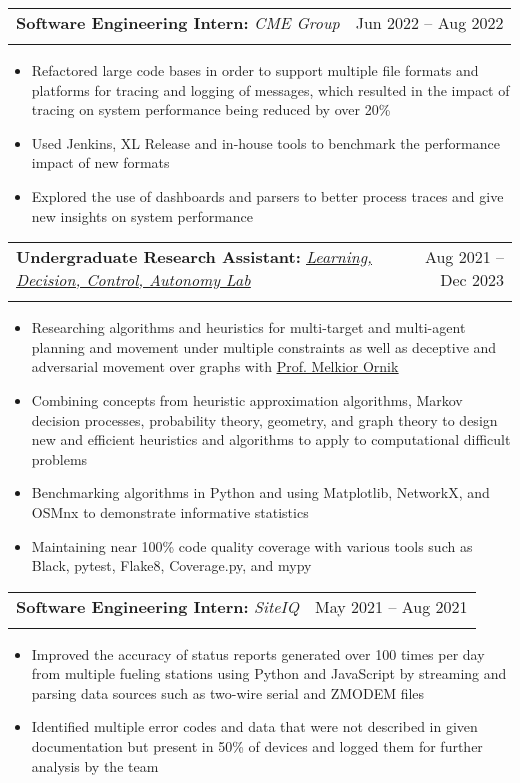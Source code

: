 \documentclass[letterpaper,11pt]{article}
\makeatletter
\newcommand{\resumeItem}[1]{
  \item\small{
    {#1 \vspace{-2pt}}
  }
}
\newcommand{\resumeSubheading}[4]{
  \vspace{-2pt}\item
    \begin{tabular*}{0.97\textwidth}[t]{l@{\extracolsep{\fill}}r}
      \textbf{#1} \textit{\small#3} & #2 \\
       & \textit{\small #4} \\
    \end{tabular*}\vspace{-20pt}
}
\newcommand{\resumeItemListStart}{\begin{itemize}}
\newcommand{\resumeItemListEnd}{\end{itemize}\vspace{-5pt}}
\makeatother
\begin{document}
    \resumeSubheading
      {Software Engineering Intern:}{Jun 2022 -- Aug 2022}
      {CME Group}{}
        \resumeItemListStart
            \resumeItem{Refactored large code bases in order to support multiple file formats and platforms for tracing and logging of messages, which resulted in the impact of tracing on system performance being reduced by over 20\%}
            \resumeItem{Used Jenkins, XL Release and in-house tools to benchmark the performance impact of new formats}
            \resumeItem{Explored the use of dashboards and parsers to better process traces and give new insights on system performance}
        \resumeItemListEnd 
    
    \resumeSubheading
          {Undergraduate Research Assistant:}{Aug 2021 -- Dec 2023}
      {\href{https://mornik.web.illinois.edu/research/group/}{\underline{Learning, Decision, Control, Autonomy Lab}}}{}
      \resumeItemListStart
        \resumeItem{Researching algorithms and heuristics for multi-target and multi-agent planning and movement under multiple constraints as well as deceptive and adversarial movement over graphs with \href{https://mornik.web.illinois.edu/}{\underline{Prof. Melkior Ornik}}}
        \resumeItem{Combining concepts from heuristic approximation algorithms, Markov decision processes, probability theory, geometry, and graph theory to design new and efficient heuristics and algorithms to apply to computational difficult problems}
        \resumeItem{Benchmarking algorithms in Python and using Matplotlib, NetworkX, and OSMnx to demonstrate informative statistics}
        \resumeItem{Maintaining near 100\% code quality coverage with various tools such as Black, pytest, Flake8, Coverage.py, and mypy}
    \resumeItemListEnd
  
    \resumeSubheading
      {Software Engineering Intern:}{May 2021 -- Aug 2021}
      {SiteIQ}{}
      \resumeItemListStart
        \resumeItem{Improved the accuracy of status reports generated over 100 times per day from multiple fueling stations using Python and JavaScript by streaming and parsing data sources such as two-wire serial and ZMODEM files}
        \resumeItem{Identified multiple error codes and data that were not described in given documentation but present in 50\% of devices and logged them for further analysis by the team}
        \resumeItemListEnd
    
\end{document}

